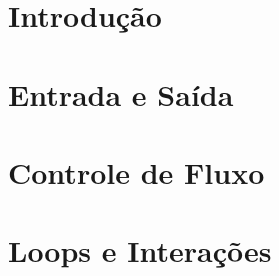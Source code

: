 \documentclass[t, 				             
			   final,
			   12pt, 				         
			   xcolor={usenames,dvipsnames}, 
			   table]{beamer}
\begin{document}
	
	
	  
	\section{Introdução}	
	
	\section{Entrada e Saída}
	
	\section{Controle de Fluxo}
	
	\section{Loops e Interações}	
	
\end{document}
